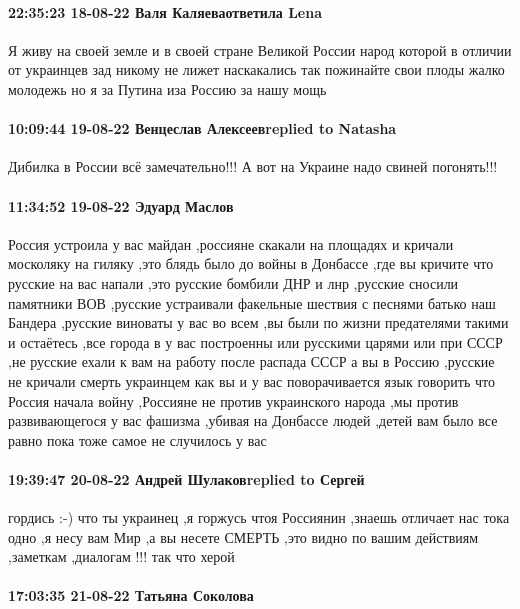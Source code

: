 \paragraph{22:35:23 18-08-22 Валя Каляеваответила Lena}

Я живу на своей земле и в своей стране Великой России народ которой в отличии
от украинцев зад никому не лижет наскакались так пожинайте свои плоды жалко
молодежь но я за Путина иза Россию за нашу мощь

\paragraph{10:09:44 19-08-22 Венцеслав Алексеевreplied to Natasha}

Дибилка в России всё замечательно!!! А вот на Украине надо свиней погонять!!!

\paragraph{11:34:52 19-08-22 Эдуард Маслов}

Россия устроила у вас майдан ,россияне скакали на площадях и кричали москоляку
на гиляку ,это блядь было до войны в Донбассе ,где вы кричите что русские на
вас напали ,это русские бомбили ДНР и лнр ,русские сносили памятники ВОВ
,русские устраивали факельные шествия с песнями батько наш Бандера ,русские
виноваты у вас во всем ,вы были по жизни предателями такими и остаётесь ,все
города в у вас построенны или русскими царями или при СССР ,не русские ехали к
вам на работу после распада СССР а вы в Россию ,русские не кричали смерть
украинцем как вы и у вас поворачивается язык говорить что Россия начала войну
,Россияне не против украинского народа ,мы против развивающегося у вас фашизма
,убивая на Донбассе людей ,детей вам было все равно пока тоже самое не
случилось у вас

\paragraph{19:39:47 20-08-22 Андрей Шулаковreplied to Сергей}

гордись :-) что ты украинец ,я горжусь чтоя Россиянин ,знаешь отличает нас тока
одно ,я несу вам Мир ,а вы несете СМЕРТЬ ,это видно по вашим действиям
,заметкам ,диалогам !!!
так что херой

\paragraph{17:03:35 21-08-22 Татьяна Соколова}

